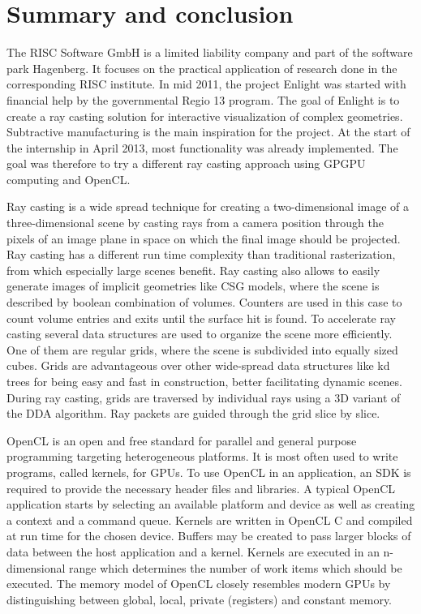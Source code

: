 \section{Summary and conclusion}
\label{sec:summary}

The RISC Software GmbH is a limited liability company and part of the software park Hagenberg. It focuses on the practical application of research done in the corresponding RISC institute. In mid 2011, the project Enlight was started with financial help by the governmental Regio 13 program. The goal of Enlight is to create a ray casting solution for interactive visualization of complex geometries. Subtractive manufacturing is the main inspiration for the project. At the start of the internship in April 2013, most functionality was already implemented. The goal was therefore to try a different ray casting approach using GPGPU computing and OpenCL.

Ray casting is a wide spread technique for creating a two-dimensional image of a three-dimensional scene by casting rays from a camera position through the pixels of an image plane in space on which the final image should be projected. Ray casting has a different run time complexity than traditional rasterization, from which especially large scenes benefit. Ray casting also allows to easily generate images of implicit geometries like CSG models, where the scene is described by boolean combination of volumes. Counters are used in this case to count volume entries and exits until the surface hit is found. To accelerate ray casting several data structures are used to organize the scene more efficiently. One of them are regular grids, where the scene is subdivided into equally sized cubes. Grids are advantageous over other wide-spread data structures like kd trees for being easy and fast in construction, better facilitating dynamic scenes. During ray casting, grids are traversed by individual rays using a 3D variant of the DDA algorithm. Ray packets are guided through the grid slice by slice.

OpenCL is an open and free standard for parallel and general purpose programming targeting heterogeneous platforms. It is most often used to write programs, called kernels, for GPUs. To use OpenCL in an application, an SDK is required to provide the necessary header files and libraries. A typical OpenCL application starts by selecting an available platform and device as well as creating a context and a command queue. Kernels are written in OpenCL C and compiled at run time for the chosen device. Buffers may be created to pass larger blocks of data between the host application and a kernel. Kernels are executed in an n-dimensional range which determines the number of work items which should be executed. The memory model of OpenCL closely resembles modern GPUs by distinguishing between global, local, private (registers) and constant memory.

